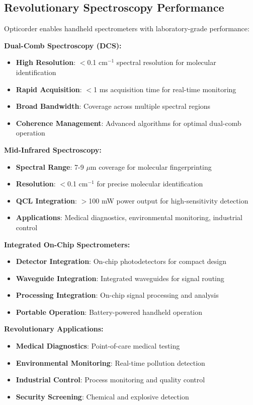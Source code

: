 \documentclass[11pt,a4paper]{article}
\begin{document}
\subsection{Revolutionary Spectroscopy Performance}
Opticorder enables handheld spectrometers with laboratory-grade performance:

\textbf{Dual-Comb Spectroscopy (DCS):}
\begin{itemize}
\item \textbf{High Resolution}: $<$0.1 cm$^{-1}$ spectral resolution for molecular identification
\item \textbf{Rapid Acquisition}: $<$1 ms acquisition time for real-time monitoring
\item \textbf{Broad Bandwidth}: Coverage across multiple spectral regions
\item \textbf{Coherence Management}: Advanced algorithms for optimal dual-comb operation
\end{itemize}

\textbf{Mid-Infrared Spectroscopy:}
\begin{itemize}
\item \textbf{Spectral Range}: 7-9 $\mu$m coverage for molecular fingerprinting
\item \textbf{Resolution}: $<$0.1 cm$^{-1}$ for precise molecular identification
\item \textbf{QCL Integration}: $>$100 mW power output for high-sensitivity detection
\item \textbf{Applications}: Medical diagnostics, environmental monitoring, industrial control
\end{itemize}

\textbf{Integrated On-Chip Spectrometers:}
\begin{itemize}
\item \textbf{Detector Integration}: On-chip photodetectors for compact design
\item \textbf{Waveguide Integration}: Integrated waveguides for signal routing
\item \textbf{Processing Integration}: On-chip signal processing and analysis
\item \textbf{Portable Operation}: Battery-powered handheld operation
\end{itemize}

\textbf{Revolutionary Applications:}
\begin{itemize}
\item \textbf{Medical Diagnostics}: Point-of-care medical testing
\item \textbf{Environmental Monitoring}: Real-time pollution detection
\item \textbf{Industrial Control}: Process monitoring and quality control
\item \textbf{Security Screening}: Chemical and explosive detection
\end{itemize}
\end{document}
